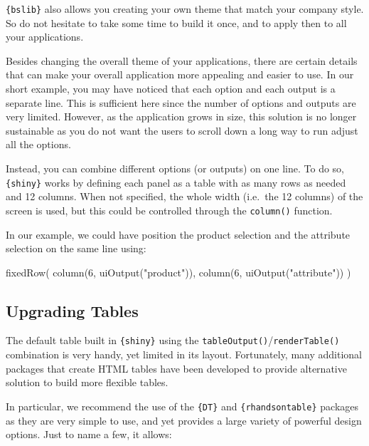 \documentclass[
]{book}
\newenvironment{Shaded}{\begin{snugshade}}{\end{snugshade}}
\newcommand{\DecValTok}[1]{\textcolor[rgb]{0.00,0.00,0.81}{#1}}
\newcommand{\FunctionTok}[1]{\textcolor[rgb]{0.00,0.00,0.00}{#1}}
\newcommand{\NormalTok}[1]{#1}
\newcommand{\StringTok}[1]{\textcolor[rgb]{0.31,0.60,0.02}{#1}}
\begin{document}
\texttt{\{bslib\}} also allows you creating your own theme that match your company style. So do not hesitate to take some time to build it once, and to apply then to all your applications.

Besides changing the overall theme of your applications, there are certain details that can make your overall application more appealing and easier to use. In our short example, you may have noticed that each option and each output is a separate line. This is sufficient here since the number of options and outputs are very limited. However, as the application grows in size, this solution is no longer sustainable as you do not want the users to scroll down a long way to run adjust all the options.

Instead, you can combine different options (or outputs) on one line. To do so, \texttt{\{shiny\}} works by defining each panel as a table with as many rows as needed and 12 columns. When not specified, the whole width (i.e.~the 12 columns) of the screen is used, but this could be controlled through the \texttt{column()} function.

In our example, we could have position the product selection and the attribute selection on the same line using:

\begin{Shaded}
\begin{Highlighting}[]
\FunctionTok{fixedRow}\NormalTok{(}
  \FunctionTok{column}\NormalTok{(}\DecValTok{6}\NormalTok{, }\FunctionTok{uiOutput}\NormalTok{(}\StringTok{"product"}\NormalTok{)),}
  \FunctionTok{column}\NormalTok{(}\DecValTok{6}\NormalTok{, }\FunctionTok{uiOutput}\NormalTok{(}\StringTok{"attribute"}\NormalTok{))}
\NormalTok{)}
\end{Highlighting}
\end{Shaded}

\hypertarget{upgrading-tables}{%
\subsection{Upgrading Tables}\label{upgrading-tables}}

The default table built in \texttt{\{shiny\}} using the \texttt{tableOutput()}/\texttt{renderTable()} combination is very handy, yet limited in its layout. Fortunately, many additional packages that create HTML tables have been developed to provide alternative solution to build more flexible tables.

In particular, we recommend the use of the \texttt{\{DT\}} and \texttt{\{rhandsontable\}} packages as they are very simple to use, and yet provides a large variety of powerful design options. Just to name a few, it allows:
\end{document}
